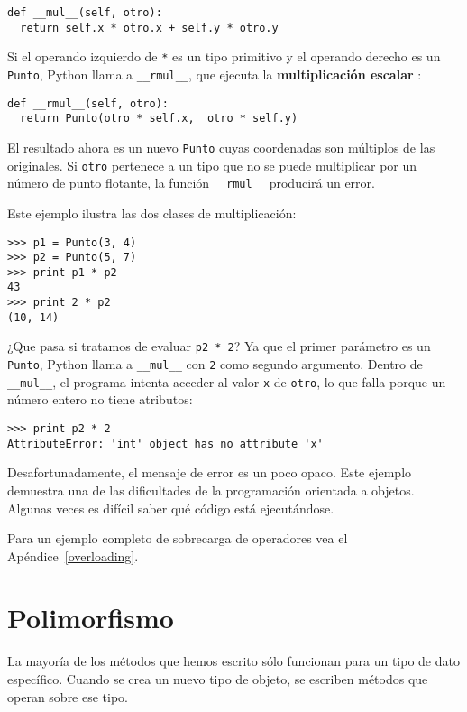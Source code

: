 \beforeverb
\begin{verbatim}
def __mul__(self, otro):
  return self.x * otro.x + self.y * otro.y
\end{verbatim}
\afterverb
%
Si el operando izquierdo de \texttt{*} es un tipo primitivo y 
el operando derecho es un \texttt{Punto}, Python llama a  \texttt{\_\_rmul\_\_}, que
ejecuta la  {\bf multiplicación escalar }:

\beforeverb
\begin{verbatim}
def __rmul__(self, otro):
  return Punto(otro * self.x,  otro * self.y)
\end{verbatim}
\afterverb
%
El resultado ahora es un nuevo  \texttt{Punto} cuyas coordenadas son  
múltiplos de las originales. Si  \texttt{otro} pertenece a un tipo que
no se puede multiplicar por un número de punto flotante, la función
\texttt{\_\_rmul\_\_} producirá un error.

Este ejemplo ilustra las dos clases de multiplicación:

\beforeverb
\begin{verbatim}
>>> p1 = Punto(3, 4)
>>> p2 = Punto(5, 7)
>>> print p1 * p2
43
>>> print 2 * p2
(10, 14)
\end{verbatim}
\afterverb
%
¿Que pasa si tratamos de evaluar \texttt{p2 * 2}? Ya que el 
primer parámetro es un  \texttt{Punto}, Python llama a
\texttt{\_\_mul\_\_} con \texttt{2} como segundo argumento.
Dentro de  \texttt{\_\_mul\_\_}, el programa intenta acceder
al  valor  \texttt{x} de \texttt{otro}, lo que falla porque
un número entero no tiene atributos:

\beforeverb
\begin{verbatim}
>>> print p2 * 2
AttributeError: 'int' object has no attribute 'x'
\end{verbatim}
\afterverb
%
Desafortunadamente, el mensaje de error es un poco opaco. Este ejemplo
demuestra una de las dificultades de la programación orientada a 
objetos. Algunas veces es difícil saber qué código está ejecutándose.

Para un ejemplo completo de sobrecarga de operadores vea el Apéndice~\ref{overloading}.


\section{Polimorfismo}

La mayoría de los métodos que hemos escrito sólo funcionan
para un tipo de dato específico. Cuando se crea un nuevo
tipo de objeto, se escriben métodos que operan sobre ese tipo.

